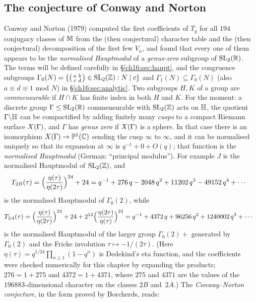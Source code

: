 \subsection{The conjecture of Conway and Norton}

Conway and Norton (1979) computed the first coefficients of $T_g$ for all $194$ conjugacy classes of $\mathbb{M}$
from the (then conjectural) character table and the (then conjectural) decomposition of the first few $V_n$, and
found that every one of them appears to be the \emph{normalised Hauptmodul} of a \emph{genus-zero} subgroup of
$\mathrm{SL}_2(\mathbb{R})$.  The terms will be defined carefully in \S\ref{ch16:sec:haupt}, and the congruence subgroups
$\Gamma_0(N)=\{\left(\begin{smallmatrix}a&b\\c&d\end{smallmatrix}\right)\in\mathrm{SL}_2(\mathbb{Z}): N\mid c\}$ and $\Gamma_1(N)\subseteq\Gamma_0(N)$ (also $a\equiv d\equiv1$
mod $N$) in \S\ref{ch16:sec:analytic}.  Two subgroups $H,K$ of a group are \emph{commensurable} if $H\cap K$ has finite
index in both $H$ and $K$.  For the moment: a discrete group
$\Gamma\le\mathrm{SL}_2(\mathbb{R})$ commensurable with $\mathrm{SL}_2(\mathbb{Z})$ acts on $\mathbb{H}$, the quotient $\Gamma\backslash
\mathbb{H}$ can be compactified by adding finitely many \emph{cusps} to a compact Riemann surface
$X(\Gamma)$, and $\Gamma$ has \emph{genus zero} if $X(\Gamma)$ is a sphere.  In that case there is an isomorphism
$X(\Gamma)\to\mathbb{P}^1({\mathbb{C}})$ sending the cusp $\infty$ to $\infty$, and it can be normalised uniquely so that its
expansion at $\infty$ is $q^{-1}+0+O(q)$; that function is the \emph{normalised Hauptmodul} (German:
``principal modulus'').  For example $J$ is the normalised Hauptmodul of $\mathrm{SL}_2(\mathbb{Z})$, and
\begin{equation}\label{ch16:eq:T2B}
  T_{2B}(\tau)=\Bigl(\frac{\eta(\tau)}{\eta(2\tau)}\Bigr)^{24}+24
  = q^{-1}+276\,q-2048\,q^2+11202\,q^3-49152\,q^4+\cdots
\end{equation}
is the normalised Hauptmodul of $\Gamma_0(2)$, while
\begin{equation}\label{ch16:eq:T2A}
  T_{2A}(\tau)=\Bigl(\frac{\eta(\tau)}{\eta(2\tau)}\Bigr)^{24}+24+2^{12}\Bigl(\frac{\eta(2\tau)}{\eta(\tau)}\Bigr)^{24}
  = q^{-1}+4372\,q+96256\,q^2+1240002\,q^3+\cdots
\end{equation}
is the normalised Hauptmodul of the larger group $\Gamma_0(2)+$ generated by $\Gamma_0(2)$ and the Fricke
involution $\tau\mapsto-1/(2\tau)$.  (Here $\eta(\tau)=q^{1/24}\prod_{n\ge1}(1-q^n)$ is Dedekind's eta function, and
the coefficients were checked numerically for this chapter by expanding the products; $276=1+275$ and
$4372=1+4371$, where $275$ and $4371$ are the values of the $196883$-dimensional character on the classes $2B$
and~$2A$.)  The \emph{Conway--Norton conjecture}, in the form proved by Borcherds, reads:

